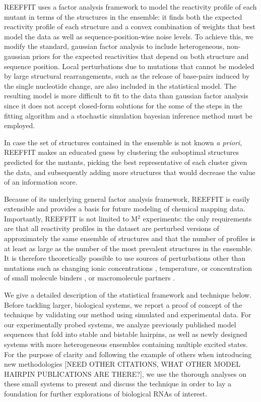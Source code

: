 \documentclass[12pt]{article}
\begin{document}
REEFFIT uses a factor analysis framework to model the reactivity profile of each mutant in terms of the structures in the ensemble: it finds both the expected reactivity profile of each structure and a convex combination of weights that best model the data as well as sequence-position-wise noise levels.
To achieve this, we modify the standard, gaussian factor analysis to include heterogeneous, non-gaussian priors for the expected reactivities that depend on both structure and sequence position. 
Local perturbations due to mutations that cannot be modeled by large structural rearrangements, such as the release of base-pairs induced by the single nucleotide change, are also included in the statistical model.
The resulting model is more difficult to fit to the data than gaussian factor analysis since it does not accept closed-form solutions for the some of the steps in the fitting algorithm and a stochastic simulation bayesian inference method must be employed.

In case the set of structures contained in the ensemble is not known \textit{a priori}, REEFFIT makes an educated guess by clustering the suboptimal structures predicted for the mutants, picking the best representative of each cluster given the data, and subsequently adding more structures that would decrease the value of an information score. 

Because of its underlying general factor analysis framework, REEFFIT is easily extensible and provides a basis for future modeling of chemical mapping data. 
Importantly, REEFFIT is not limited to M$^2$ experiments: the only requirements are that all reactivity profiles in the dataset are perturbed versions of approximately the same ensemble of structures and that the number of profiles is at least as large as the number of the most prevalent structures in the ensemble. 
It is therefore theoretically possible to use sources of perturbations other than mutations such as changing ionic concentrations  \cite{Das2010}, temperature, or concentration of small molecule binders \cite{Kladwang2011f}, or macromolecule partners \cite{Kladwang2010}.

We give a detailed description of the statistical framework and technique below. 
Before tackling larger, biological systems, we report a proof of concept of the technique by validating our method using simulated and experimental data. 
For our experimentally probed systems, we analyze previously published model sequences that fold into stable and bistable hairpins, as well as newly designed systems with more heterogeneous ensembles containing multiple excited states.
For the purpose of clarity and following the example of others when introducing new methodologies \cite{Ma2006} [NEED OTHER CITATIONS, WHAT OTHER MODEL HAIRPIN PUBLICATIONS ARE THERE?], we use the thorough analyses on these small systems to present and discuss the technique in order to lay a foundation for further explorations of biological RNAs of interest. 
\end{document}
